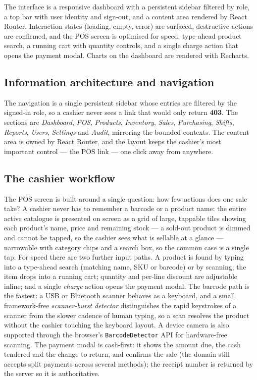 \documentclass[11pt,a4paper]{article}
\begin{document}
The interface is a responsive dashboard with a persistent sidebar filtered by role, a top bar with
user identity and sign-out, and a content area rendered by React Router. Interaction states
(loading, empty, error) are surfaced, destructive actions are confirmed, and the POS screen is
optimised for speed: type-ahead product search, a running cart with quantity controls, and a single
charge action that opens the payment modal. Charts on the dashboard are rendered with Recharts.

\subsection{Information architecture and navigation}

The navigation is a single persistent sidebar whose entries are filtered by the signed-in role, so a
cashier never sees a link that would only return \textbf{403}. The sections are \emph{Dashboard},
\emph{POS}, \emph{Products}, \emph{Inventory}, \emph{Sales}, \emph{Purchasing}, \emph{Shifts},
\emph{Reports}, \emph{Users}, \emph{Settings} and \emph{Audit}, mirroring the bounded contexts. The
content area is owned by React Router, and the layout keeps the cashier's most important control ---
the POS link --- one click away from anywhere.

\subsection{The cashier workflow}

The POS screen is built around a single question: how few actions does one sale take? A cashier never
has to remember a barcode or a product name: the entire active catalogue is presented on screen as a
grid of large, tappable tiles showing each product's name, price and remaining stock --- a sold-out
product is dimmed and cannot be tapped, so the cashier sees what is sellable at a glance ---
narrowable with category chips and a search box, so the common case is a single tap. For speed there
are two further input paths. A
product is found by typing into a type-ahead search (matching name, SKU or barcode) or by scanning; the item
drops into a running cart; quantity and per-line discount are adjustable inline; and a single
\emph{charge} action opens the payment modal. The barcode path is the fastest: a USB or Bluetooth
scanner behaves as a keyboard, and a small framework-free \emph{scanner-burst detector} distinguishes
the rapid keystrokes of a scanner from the slower cadence of human typing, so a scan resolves the
product without the cashier touching the keyboard layout. A device camera is also supported through
the browser's \texttt{BarcodeDetector} API for hardware-free scanning. The payment modal is
cash-first: it shows the amount due, the cash tendered and the change to return, and confirms the
sale (the domain still accepts split payments across several methods); the receipt number is returned
by the server so it is authoritative.
\end{document}
